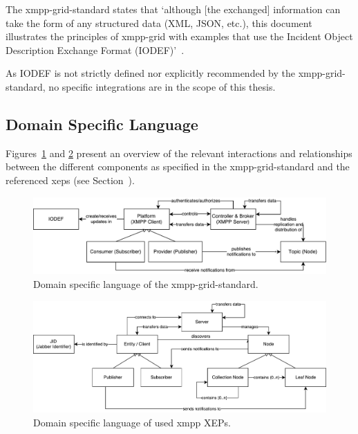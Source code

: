 The \gls{xmpp-grid-standard} states that `although [the exchanged] information can take the form of any structured data (XML, JSON, etc.), this document illustrates the principles of \gls{xmpp-grid} with examples that use the Incident Object Description Exchange Format (IODEF)'~\cite{rfc7970, ietf-mile-xmpp-grid-05}.

As IODEF is not strictly defined nor explicitly recommended by the \gls{xmpp-grid-standard}, no specific integrations are in the scope of this thesis.

\subsection{Domain Specific Language}

Figures~\ref{fig:architecturedslgriddraft} and \ref{fig:architecturedslxeps} present an overview of the relevant interactions and relationships between the different components as specified in the \gls{xmpp-grid-standard} and the referenced \glspl{xep} (see Section~).

\begin{figure}[h]
\centering
\includegraphics[width=\linewidth]{resources/architecture_dsl_grid_draft}
\caption[DSL of the \gls{xmpp-grid-standard}]{Domain specific language of the \gls{xmpp-grid-standard}.}
\label{fig:architecturedslgriddraft}
\end{figure}

\begin{figure}[h]
\centering
\includegraphics[width=\linewidth]{resources/architecture_dsl_xeps}
\caption[DSL of used \gls{xmpp} XEPs]{Domain specific language of used \gls{xmpp} XEPs.}
\label{fig:architecturedslxeps}
\end{figure}

